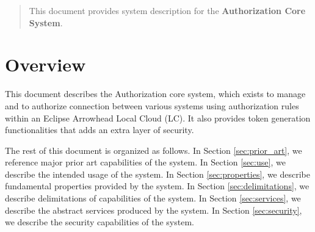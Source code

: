 \documentclass[a4paper]{arrowhead}
\begin{document}
\ArrowheadDate{\today}
\ArrowheadSetup

\begin{center}
  \vspace*{1cm}
  \huge{\arrowtitle}

  \vspace*{0.2cm}
  \LARGE{\arrowtype}
  \vspace*{1cm}

  \vspace*{\fill}


  \vspace*{1cm}
  \vspace*{\fill}

  \begin{abstract}
    This document provides system description for the \textbf{Authorization Core System}.
  \end{abstract}

  \vspace*{1cm}

 \end{center}

\newpage

\tableofcontents
\newpage

\section{Overview}
\label{sec:overview}
\color{black}
This document describes the Authorization core system, which exists to manage and to authorize
connection between various systems using authorization rules within an Eclipse Arrowhead Local Cloud (LC). It also provides token generation functionalities that adds an extra layer of security. 

The rest of this document is organized as follows.
In Section \ref{sec:prior_art}, we reference major prior art capabilities
of the system.
In Section \ref{sec:use}, we describe the intended usage of the system.
In Section \ref{sec:properties}, we describe fundamental properties
provided by the system.
In Section \ref{sec:delimitations}, we describe delimitations of capabilities
of the system.
In Section \ref{sec:services}, we describe the abstract services produced by the system.
In Section \ref{sec:security}, we describe the security capabilities
of the system.
\end{document}
